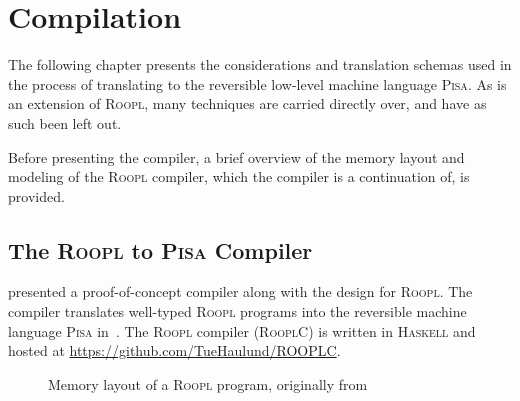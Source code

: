 \chapter{Compilation}
\label{chp:compilation}
The following chapter presents the considerations and translation schemas used in the process of translating \rooplpp to the reversible low-level machine language \textsc{Pisa}. As \rooplpp is an extension of \textsc{Roopl}, many techniques are carried directly over, and have as such been left out.

Before presenting the \rooplpp compiler, a brief overview of the memory layout and modeling of the \textsc{Roopl} compiler, which the \rooplpp compiler is a continuation of, is provided. 

\section{The \textsc{Roopl} to \textsc{Pisa} Compiler}
\label{sec:roopl-to-pisa-compiler}
\citeauthor{th:roopl} presented a proof-of-concept compiler along with the design for \textsc{Roopl}. The compiler translates well-typed \textsc{Roopl} programs into the reversible machine language \textsc{Pisa} in~\cite{th:roopl}. The \textsc{Roopl} compiler (\textsc{RooplC}) is written in \textsc{Haskell} and hosted at \url{https://github.com/TueHaulund/ROOPLC}.

\begin{figure}[ht]
    \centering
    \caption{Memory layout of a \textsc{Roopl} program, originally from~\cite{th:roopl}}
    \label{fig:roopl-memory-layout}
\end{figure}

